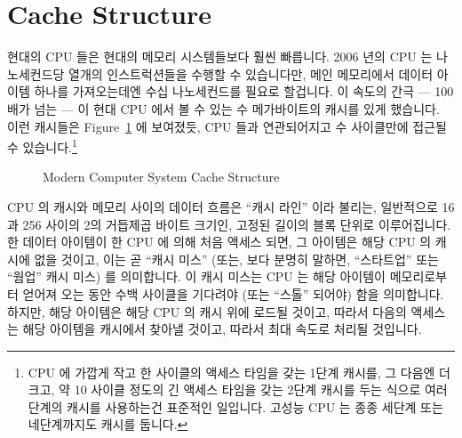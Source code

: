 \section{Cache Structure}
\label{sec:app:whymb:Cache Structure}

현대의 CPU 들은 현대의 메모리 시스템들보다 훨씬 빠릅니다.
2006 년의 CPU 는 나노세컨드당 열개의 인스트럭션들을 수행할 수 있습니다만, 메인
메모리에서 데이터 아이템 하나를 가져오는데엔 수십 나노세컨드를 필요로 할겁니다.
이 속도의 간극 --- 100 배가 넘는 --- 이 현대 CPU 에서 볼 수 있는 수
메가바이트의 캐시를 있게 했습니다.
이런 캐시들은 Figure~\ref{fig:app:whymb:Modern Computer System Cache Structure}
에 보여졌듯, CPU 들과 연관되어지고 수 사이클만에 접근될 수 있습니다.\footnote{
	CPU 에 가깝게 작고 한 사이클의 액세스 타임을 갖는 1단계 캐시를, 그
	다음엔 더 크고, 약 10 사이클 정도의 긴 액세스 타임을 갖는 2단계 캐시를
	두는 식으로 여러 단계의 캐시를 사용하는건 표준적인 일입니다.
	고성능 CPU 는 종종 세단계 또는 네단계까지도 캐시를 둡니다.}

\begin{figure}[htb]
\begin{center}
\end{center}
\caption{Modern Computer System Cache Structure}
\label{fig:app:whymb:Modern Computer System Cache Structure}
\end{figure}

CPU 의 캐시와 메모리 사이의 데이터 흐름은 ``캐시 라인'' 이라 불리는, 일반적으로
16 과 256 사이의 2의 거듭제곱 바이트 크기인, 고정된 길이의 블록 단위로
이루어집니다.
한 데이터 아이템이 한 CPU 에 의해 처음 액세스 되면, 그 아이템은 해당 CPU 의
캐시에 없을 것이고, 이는 곧 ``캐시 미스'' (또는, 보다 분명히 말하면,
``스타트업'' 또는 ``웜업'' 캐시 미스) 를 의미합니다.
이 캐시 미스는 CPU 는 해당 아이템이 메모리로부터 얻어져 오는 동안 수백 사이클을
기다려야 (또는 ``스톨'' 되어야) 함을 의미합니다.
하지만, 해당 아이템은 해당 CPU 의 캐시 위에 로드될 것이고, 따라서 다음의 액세스는
해당 아이템을 캐시에서 찾아낼 것이고, 따라서 최대 속도로 처리될 것입니다.
\iffalse

